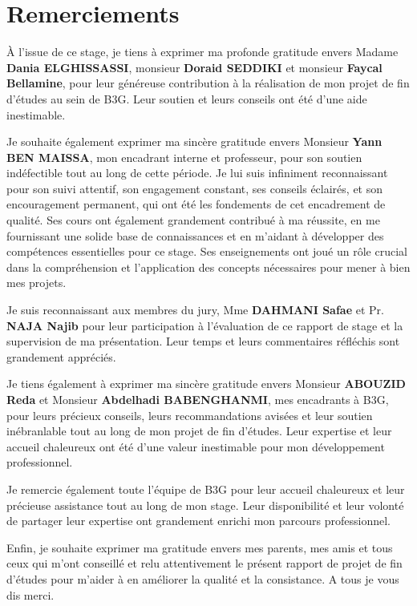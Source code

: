 \chapter*{Remerciements}

\hspace{\parindent} À l'issue de ce stage, je tiens à exprimer ma profonde gratitude envers Madame \textbf{Dania ELGHISSASSI}, monsieur \textbf{Doraid SEDDIKI} et monsieur \textbf{Faycal Bellamine}, pour leur généreuse contribution à la réalisation de mon projet de fin d'études au sein de B3G. Leur soutien et leurs conseils ont été d'une aide inestimable.

Je souhaite également exprimer ma sincère gratitude envers Monsieur \textbf{Yann BEN MAISSA}, mon encadrant interne et professeur, pour son soutien indéfectible tout au long de cette période. Je lui suis infiniment reconnaissant pour son suivi attentif, son engagement constant, ses conseils éclairés, et son encouragement permanent, qui ont été les fondements de cet encadrement de qualité. Ses cours ont également grandement contribué à ma réussite, en me fournissant une solide base de connaissances et en m'aidant à développer des compétences essentielles pour ce stage. Ses enseignements ont joué un rôle crucial dans la compréhension et l'application des concepts nécessaires pour mener à bien mes projets.

Je suis reconnaissant aux membres du jury, Mme \textbf{DAHMANI Safae} et Pr. \textbf{NAJA Najib} pour leur participation à l'évaluation de ce rapport de stage et la supervision de ma présentation. Leur temps et leurs commentaires réfléchis sont grandement appréciés.

Je tiens également à exprimer ma sincère gratitude envers Monsieur \textbf{ABOUZID Reda} et Monsieur \textbf{Abdelhadi BABENGHANMI}, mes encadrants à B3G, pour leurs précieux conseils, leurs recommandations avisées et leur soutien inébranlable tout au long de mon projet de fin d’études. Leur expertise et leur accueil chaleureux ont été d'une valeur inestimable pour mon développement professionnel.


Je remercie également toute l'équipe de B3G pour leur accueil chaleureux et leur précieuse assistance tout au long de mon stage. Leur disponibilité et leur volonté de partager leur expertise ont grandement enrichi mon parcours professionnel.

Enfin, je souhaite exprimer ma gratitude envers mes parents, mes amis et tous ceux qui m'ont conseillé et relu attentivement le présent rapport de projet de fin d’études pour m’aider à en améliorer la qualité et la consistance. A tous je vous dis merci.

